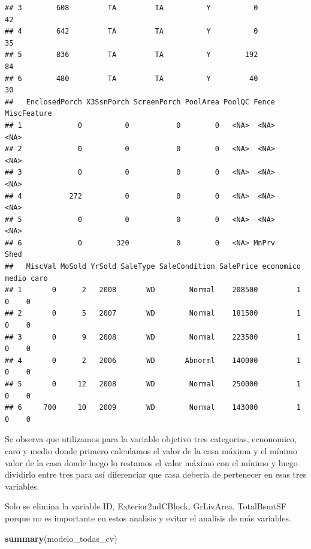 \documentclass[
]{article}
\newenvironment{Shaded}{\begin{snugshade}}{\end{snugshade}}
\newcommand{\FunctionTok}[1]{\textcolor[rgb]{0.13,0.29,0.53}{\textbf{#1}}}
\newcommand{\NormalTok}[1]{#1}
\begin{document}
\begin{verbatim}
## 3        608         TA         TA          Y          0          42
## 4        642         TA         TA          Y          0          35
## 5        836         TA         TA          Y        192          84
## 6        480         TA         TA          Y         40          30
##   EnclosedPorch X3SsnPorch ScreenPorch PoolArea PoolQC Fence MiscFeature
## 1             0          0           0        0   <NA>  <NA>        <NA>
## 2             0          0           0        0   <NA>  <NA>        <NA>
## 3             0          0           0        0   <NA>  <NA>        <NA>
## 4           272          0           0        0   <NA>  <NA>        <NA>
## 5             0          0           0        0   <NA>  <NA>        <NA>
## 6             0        320           0        0   <NA> MnPrv        Shed
##   MiscVal MoSold YrSold SaleType SaleCondition SalePrice economico medio caro
## 1       0      2   2008       WD        Normal    208500         1     0    0
## 2       0      5   2007       WD        Normal    181500         1     0    0
## 3       0      9   2008       WD        Normal    223500         1     0    0
## 4       0      2   2006       WD       Abnorml    140000         1     0    0
## 5       0     12   2008       WD        Normal    250000         1     0    0
## 6     700     10   2009       WD        Normal    143000         1     0    0
\end{verbatim}

Se observa que utilizamos para la variable objetivo tres categorias,
ecnonomico, caro y medio donde primero calculamos el valor de la casa
máxima y el mínimo valor de la casa donde luego lo restamos el valor
máximo con el mínimo y luego dividirlo entre tres para así diferenciar
que casa deberia de pertenecer en esas tres variables.

Solo se elimina la variable ID, Exterior2ndCBlock, GrLivArea,
TotalBsmtSF porque no es importante en estos analisis y evitar el
analisis de más variables.

\begin{Shaded}
\begin{Highlighting}[]
\FunctionTok{summary}\NormalTok{(modelo\_todas\_cv)}
\end{Highlighting}
\end{Shaded}
\end{document}
